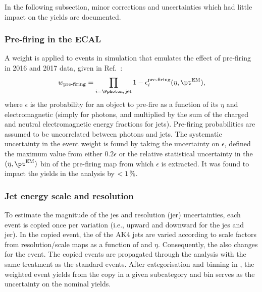 In the following subsection, minor corrections and uncertainties which had little impact on the yields are documented.




\subsubsection{Pre-firing in the ECAL}
\label{subsubsec:htoinv_ecal_prefiring_weight}

A weight is applied to events in simulation that emulates the effect of pre-firing in 2016 and 2017 data, given in Ref.~:
\begin{equation}
    w_{\text{pre-firing}} = \prod_{i = \Pphoton,\, \mathrm{jet}} 1 - \epsilon_i^{\text{pre-firing}}(\eta, \pt^{\mathrm{EM}}),
    \label{eq:prefiring_weight}
\end{equation}
where $\epsilon$ is the probability for an object to pre-fire as a function of its $\eta$ and electromagnetic \pt (simply \pt for photons, and \pt multiplied by the sum of the charged and neutral electromagnetic energy fractions for \glspl{jet}). Pre-firing probabilities are assumed to be uncorrelated between photons and jets. The systematic uncertainty in the event weight is found by taking the uncertainty on $\epsilon$, defined the maximum value from either $\text{0.2}\epsilon$ or the relative statistical uncertainty in the $(\eta, \pt^{\mathrm{EM}})$ bin of the pre-firing map from which $\epsilon$ is extracted. It was found to impact the yields in the analysis by $< \text{1\,\%}$.





\subsubsection{Jet energy scale and resolution}
\label{subsubsec:htoinv_JES_JER_systs}

To estimate the magnitude of the \acrfull{jes} and resolution (\acrshort{jer}) uncertainties, each event is copied once per variation (i.e., upward and downward for the \acrshort{jes} and \acrshort{jer}). In the copied event, the \pt of the AK4 \glspl{jet} are varied according to scale factors from resolution/scale maps as a function of \pt and $\eta$. Consequently, the \ptvecmiss also changes for the event. The copied events are propagated through the analysis with the same treatment as the standard events. After categorisation and binning in \ptmiss, the weighted event yields from the copy in a given subcategory and \ptmiss bin serves as the uncertainty on the nominal yields.

